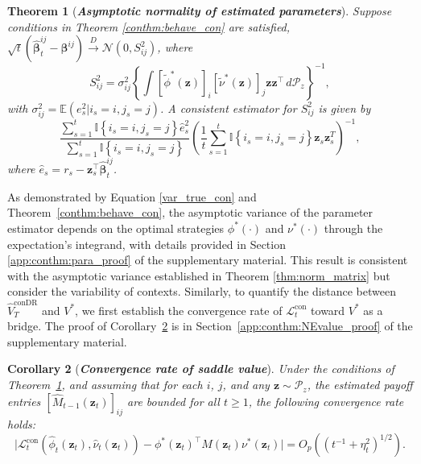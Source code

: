\documentclass[12pt]{article}
\newtheorem{theorem}{Theorem}
\newtheorem{corollary}[theorem]{Corollary}
\begin{document}
\begin{theorem}[\textbf{{\emph{Asymptotic normality of estimated parameters}}}]
\label{conthm:para}
    Suppose conditions in Theorem \ref{conthm:behave_con} are satisfied, $\sqrt{t}\left(\widehat{\bm{\beta}}_t^{ij} - \bm{\beta}^{ij}\right) \overset{D}{\to} \mathcal{N}(0,S_{ij}^2)$, where
    \begin{equation}
    \label{var_true_con}
        S_{ij}^2 = \sigma_{ij}^2 \left\{ \int [\widetilde \phi^\ast(\bm{z})]_i [\widetilde \nu^\ast(\bm{z})]_j \bm{z} \bm{z}^\top \,d\mathcal{P}_z \right\}^{-1},
    \end{equation}
    \vspace{-0.2cm}
    with $\sigma_{ij}^2 = \mathbb{E}(e_s^2\vert i_s=i,j_s=j)$. A consistent estimator for $S_{ij}^2$ is given by
    \begin{equation}
    \label{var_est_con}
    \frac{\sum_{s=1}^{t} \mathbb{I}\left\{i_s=i,j_s=j \right\}\widehat{e}_s^2}{\sum_{s=1}^{t} \mathbb{I}\left\{i_s=i,j_s=j \right\}} \left( \frac{1}{t} \sum_{s=1}^{t} \mathbb{I}\left\{i_s=i,j_s=j \right\} \bm{z}_s \bm{z}_s^T \right)^{-1},
    \end{equation}
    where $\widehat{e}_s = r_s - \bm{z}_s^\top\widehat{\bm{\beta}}^{ij}_t$.
\end{theorem}

As demonstrated by Equation \eqref{var_true_con} and Theorem~\ref{conthm:behave_con}, the asymptotic variance of the parameter estimator depends on the optimal strategies $\phi^\ast(\cdot)$ and $\nu^\ast(\cdot)$ through the expectation’s integrand, with details provided in Section \ref{app:conthm:para_proof} of the supplementary material. This result is consistent with the asymptotic variance established in Theorem \ref{thm:norm_matrix} but consider the variability of contexts.
Similarly, to quantify the distance between $\widehat{V}_T^{\text{conDR}}$ and $V^\ast$, we first establish the convergence rate of $\mathcal{L}_t^{\mathrm{con}}$ toward $V^\ast$ as a bridge. The proof of Corollary~\ref{conthm:NEvalue} is in Section~\ref{app:conthm:NEvalue_proof} of the supplementary material.

\begin{corollary}[\textbf{{\emph{Convergence rate of saddle value}}}]
\label{conthm:NEvalue}
Under the conditions of Theorem~\ref{conthm:para}, and assuming that for each $i$, $j$, and any $\bm{z} \sim \mathcal{P}_z$, the estimated payoff entries $[\widehat{M}_{t-1}(\bm{z}_t)]_{ij}$ are bounded for all $t \ge 1$, the following convergence rate holds:
\[
\vert {\mathcal{L}}_t^{\mathrm{con}}(\widehat{\phi}_t(\bm{z}_t),\widehat{\nu}_t(\bm{z}_t)) - \phi^\ast(\bm{z}_t)^\top M(\bm{z}_t) \nu^\ast(\bm{z}_t) \vert = O_p\left((t^{-1}+\eta_t^2)^{1/2}\right).
\]
\end{corollary}
\end{document}
